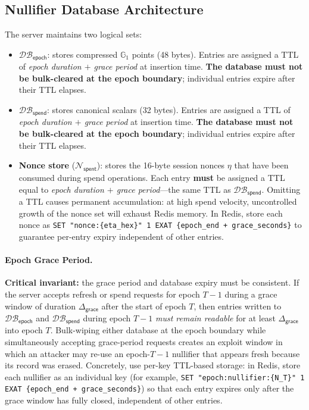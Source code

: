 \documentclass[11pt]{article}
\theoremstyle{definitionstyle}
\theoremstyle{plain}
\newcommand{\DB}{\mathcal{DB}}
\begin{document}
\subsection{Nullifier Database Architecture}

The server maintains two logical sets:

\begin{itemize}
\item $\DB_{\mathsf{epoch}}$: stores compressed $\mathbb{G}_1$ points (48 bytes). Entries are assigned a TTL of \emph{epoch duration $+$ grace period} at insertion time. \textbf{The database must not be bulk-cleared at the epoch boundary}; individual entries expire after their TTL elapses.
\item $\DB_{\mathsf{spend}}$: stores canonical scalars (32 bytes). Entries are assigned a TTL of \emph{epoch duration $+$ grace period} at insertion time. \textbf{The database must not be bulk-cleared at the epoch boundary}; individual entries expire after their TTL elapses.
\item \textbf{Nonce store} ($\mathcal{N}_{\mathsf{spent}}$): stores the 16-byte session nonces $\eta$ that have been consumed during spend operations. Each entry \textbf{must} be assigned a TTL equal to \emph{epoch duration $+$ grace period}---the same TTL as $\DB_{\mathsf{spend}}$. Omitting a TTL causes permanent accumulation: at high spend velocity, uncontrolled growth of the nonce set will exhaust Redis memory. In Redis, store each nonce as \verb|SET "nonce:{eta_hex}" 1 EXAT {epoch_end + grace_seconds}| to guarantee per-entry expiry independent of other entries.
\end{itemize}

\paragraph{Epoch Grace Period.}
\textbf{Critical invariant:} the grace period and database expiry must be consistent. If the server accepts refresh or spend requests for epoch $T-1$ during a grace window of duration $\Delta_{\mathsf{grace}}$ after the start of epoch $T$, then entries written to $\DB_{\mathsf{epoch}}$ and $\DB_{\mathsf{spend}}$ during epoch $T-1$ \emph{must remain readable} for at least $\Delta_{\mathsf{grace}}$ into epoch $T$. Bulk-wiping either database at the epoch boundary while simultaneously accepting grace-period requests creates an exploit window in which an attacker may re-use an epoch-$T{-}1$ nullifier that appears fresh because its record was erased. Concretely, use per-key TTL-based storage: in Redis, store each nullifier as an individual key (for example, \verb|SET "epoch:nullifier:{N_T}" 1 EXAT {epoch_end + grace_seconds}|) so that each entry expires only after the grace window has fully closed, independent of other entries.
\end{document}
